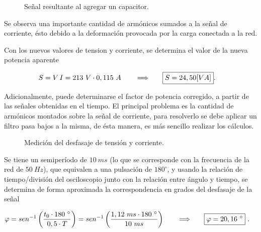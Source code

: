         \begin{figure}[H]
          \centering
          \caption{Señal resultante al agregar un capacitor.}
          \label{fig: Señal_Correccion}
        \end{figure}

        Se observa una importante cantidad de armónicos sumados a la señal de corriente, ésto debido
        a la deformación provocada por la carga conectada a la red.

         Con los nuevos valores de tension y corriente, se determina el valor de la nueva potencia 
         aparente

        \begin{align*}
          S = V\,I  = 213~V \cdot 0,115\ A \hspace{20pt} \Longrightarrow \hspace{20pt} \Aboxed{S = 24,50 [VA]}.
        \end{align*}

          Adicionalmente, puede determinarse el factor de potencia corregido, a partir de las señales
          obtenidas en el tiempo. El principal problema es la cantidad de armónicos montados sobre 
          la señal de corriente, para resolverlo se debe aplicar un filtro pasa bajos a la misma, de
         ésta manera, es más sencillo realizar los cálculos.

        \begin{figure}[H]
          \centering
          \caption{Medición del desfasaje de tensión y corriente.}
          \label{fig: Desfasaje tensión-corriente.}
        \end{figure}  

        Se tiene un semiperíodo de $10~ms$ (lo que se corresponde con la frecuencia de la red de $50~Hz$),
        que equivalen a una pulsación de $180 ^{\circ}$, y usando la relación de tiempo/división del 
        osciloscopio junto con la relación entre ángulo y tiempo, se determina de forma aproximada la correspondencia 
        en grados del desfasaje de la señal

        \begin{align*}
          \varphi = sen ^{-1} \left( \dfrac{t_{0} \cdot 180\ ^{\circ}}{0,5 \cdot T} \right) = sen ^{-1} \left( \dfrac{1,12~ms \cdot 180\ ^{\circ}}{10~ms} \right) \hspace{20pt} \Longrightarrow \hspace{20pt} \Aboxed{\varphi = 20,16\ ^{\circ}}\ .
        \end{align*}    

   
